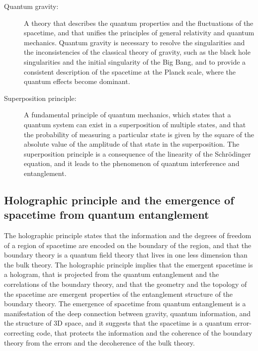 \begin{tcolorbox}[colback=blue!5!white,colframe=blue!75!black,title=New terms]
\begin{description}
\item[Quantum gravity:] A theory that describes the quantum properties and the fluctuations of the spacetime, and that unifies the principles of general relativity and quantum mechanics. Quantum gravity is necessary to resolve the singularities and the inconsistencies of the classical theory of gravity, such as the black hole singularities and the initial singularity of the Big Bang, and to provide a consistent description of the spacetime at the Planck scale, where the quantum effects become dominant.
\item[Superposition principle:] A fundamental principle of quantum mechanics, which states that a quantum system can exist in a superposition of multiple states, and that the probability of measuring a particular state is given by the square of the absolute value of the amplitude of that state in the superposition. The superposition principle is a consequence of the linearity of the Schrödinger equation, and it leads to the phenomenon of quantum interference and entanglement.
\end{description}
\end{tcolorbox}

\subsection{Holographic principle and the emergence of spacetime from quantum entanglement}
The holographic principle states that the information and the degrees of freedom of a region of spacetime are encoded on the boundary of the region, and that the boundary theory is a quantum field theory that lives in one less dimension than the bulk theory. The holographic principle implies that the emergent spacetime is a hologram, that is projected from the quantum entanglement and the correlations of the boundary theory, and that the geometry and the topology of the spacetime are emergent properties of the entanglement structure of the boundary theory. The emergence of spacetime from quantum entanglement is a manifestation of the deep connection between gravity, quantum information, and the structure of 3D space, and it suggests that the spacetime is a quantum error-correcting code, that protects the information and the coherence of the boundary theory from the errors and the decoherence of the bulk theory.


